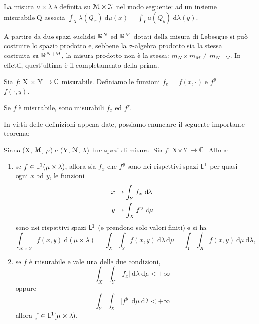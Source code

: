 \documentclass[Completo.tex]{subfiles}
\begin{document}
\begin{Def}
	La misura $\mu \times \lambda$ è definita su $\eu[M] \times \eu[N]$ nel modo seguente: ad un insieme misurabile Q associa $\int_X \lambda(Q_x) \ \mathrm{d}\mu(x) = \int_Y \mu(Q_y) \ \mathrm{d}\lambda(y)$.
\end{Def}
\begin{Ex}
	A partire da due spazi euclidei $\bb[R]^{N}$ ed $\bb[R]^{M}$ dotati della misura di Lebesgue si può costruire lo spazio prodotto e, sebbene la $\sigma$-algebra prodotto sia la stessa costruita su $\bb[R]^{N+M}$, la misura prodotto non è la stessa: $m_N \times m_M \neq m_{N+M}$. In effetti, quest'ultima è il completamento della prima.
\end{Ex}
\begin{Def}
	Sia $f$: X $\times$ Y $\ra \bb[C]$ misurabile. Definiamo le funzioni $f_x$ = $f(x, \cdot)$ e $f^y$ = $f(\cdot, y)$.
\end{Def}
\begin{Prop}
	Se $f$ è misurabile, sono misurabili $f_x$ ed $f^y$.
\end{Prop}
In virtù delle definizioni appena date, possiamo enunciare il seguente importante teorema:
\begin{Th}
	Siano (X, $\eu[M]$, $\mu$) e (Y, $\eu[N]$, $\lambda$) due spazi di misura. Sia $f$: X$\times$Y $\ra \bb[C]$. Allora:
	\begin{enumerate}
		\item se $f \in \sf[L]^1(\mu \times \lambda)$, allora sia $f_x$ che $f^y$ sono nei rispettivi spazi $\sf[L]^1$ per quasi ogni $x$ od $y$, le funzioni
		\begin{align*}
		x &\rightarrow \int_Y f_x \ \mathrm{d}\lambda \\
		y &\rightarrow \int_X f^y \ \mathrm{d}\mu
		\end{align*}
		sono nei rispettivi spazi $\sf[L]^1$ (e prendono solo valori finiti) e si ha
		\begin{equation*}
		\int_{X \times Y} f(x,y) \ \mathrm{d}(\mu \times \lambda) = \int_X \int_Y f(x,y) \ \mathrm{d}\lambda \ \mathrm{d}\mu = \int_Y \int_X f(x,y) \ \mathrm{d}\mu \ \mathrm{d}\lambda,
		\end{equation*}
		\item se $f$ è misurabile e vale una delle due condizioni,
		\begin{equation*}
		\int_X \int_Y \vert f_x \vert \ \mathrm{d}\lambda \ \mathrm{d}\mu < +\infty
		\end{equation*}
		oppure
		\begin{equation*}
				\int_Y \int_X \vert f^y \vert \ \mathrm{d}\mu \ \mathrm{d}\lambda < +\infty
		\end{equation*}
		allora $f \in \sf[L]^1(\mu \times \lambda)$.
	\end{enumerate}
\end{Th}
\end{document}
